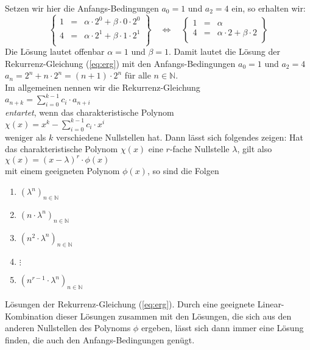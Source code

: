Setzen wir hier die Anfangs-Bedingungen $a_0 = 1$ und $a_2 = 4$ ein, so erhalten wir:
\[
\left\{
\begin{array}{lcl}
  1 & = & \alpha \cdot 2^0 + \beta \cdot 0 \cdot 2^0 \\
  4 & = & \alpha \cdot 2^1 + \beta \cdot 1 \cdot 2^1 \\
\end{array}
\right\} \quad\Leftrightarrow\quad \left\{
\begin{array}{lcl}
  1 & = & \alpha \\
  4 & = & \alpha \cdot 2 + \beta \cdot 2 \\
\end{array}
\right\}\]
Die L\"{o}sung lautet offenbar $\alpha = 1$ und $\beta = 1$.  Damit lautet die L\"{o}sung der
Rekurrenz-Gleichung (\ref{eq:erg}) mit den Anfangs-Bedingungen $a_0 = 1$ und $a_2 = 4$ \\[0.2cm]
\hspace*{1.3cm} $a_n = 2^n + n \cdot 2^n = (n+1) \cdot 2^n$ \quad f\"{u}r alle $n \in \mathbb{N}$.  \\[0.2cm]
Im allgemeinen nennen wir die Rekurrenz-Gleichung \\[0.2cm]
\hspace*{1.3cm} $a_{n+k} = \sum\limits_{i=0}^{k-1} c_{i} \cdot a_{n+i}$ \\[0.2cm]
\emph{entartet}, wenn das charakteristische Polynom \\[0.2cm]
\hspace*{1.3cm} $\chi(x) = x^k - \sum\limits_{i=0}^{k-1} c_{i} \cdot x^{i}$  \\[0.2cm]
weniger als $k$ verschiedene Nullstellen hat.  Dann l\"{a}sst sich folgendes
zeigen:  Hat das charakteristische Polynom $\chi(x)$ eine $r$-fache Nullstelle
$\lambda$, gilt also \\[0.2cm]
\hspace*{1.3cm} $\chi(x) = (x - \lambda)^r \cdot \phi(x)$ \\[0.2cm]
mit einem geeigneten Polynom $\phi(x)$, so sind die Folgen
\begin{enumerate}
\item $(\lambda^n)_{n\in\mathbb{N}}$
\item $(n\cdot\lambda^n)_{n\in\mathbb{N}}$
\item $(n^2\cdot\lambda^n)_{n\in\mathbb{N}}$
\item $\vdots$
\item $(n^{r-1}\cdot\lambda^n)_{n\in\mathbb{N}}$
\end{enumerate}
L\"{o}sungen der Rekurrenz-Gleichung (\ref{eq:erg}).  Durch eine geeignete Linear-Kombination dieser
L\"{o}sungen zusammen mit den L\"{o}sungen, die sich aus den anderen Nullstellen des Polynoms $\phi$
ergeben, l\"{a}sst sich dann immer eine L\"{o}sung finden, die auch den Anfangs-Bedingungen gen\"{u}gt.
\vspace*{0.3cm}

